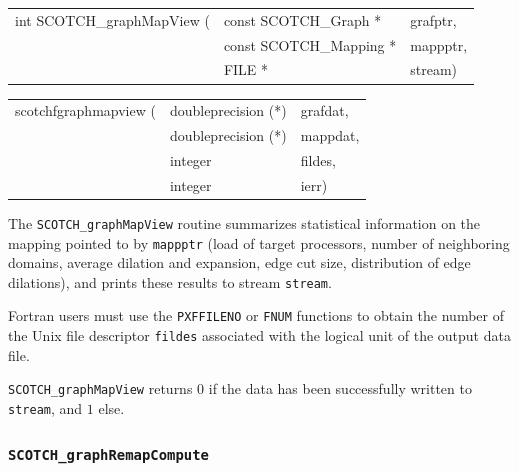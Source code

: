 \begin{itemize}
\progsyn

{\tt\begin{tabular}{l@{}ll}
int SCOTCH\_graphMapView ( & const SCOTCH\_Graph *   & grafptr, \\
                           & const SCOTCH\_Mapping * & mappptr, \\
                           & FILE *                  & stream)
\end{tabular}}

{\tt\begin{tabular}{l@{}ll}
scotchfgraphmapview ( & doubleprecision (*) & grafdat, \\
                      & doubleprecision (*) & mappdat, \\
                      & integer             & fildes,  \\
                      & integer             & ierr)
\end{tabular}}

\progdes

The {\tt SCOTCH\_graphMapView} routine summarizes statistical
information on the mapping pointed to by {\tt mappptr} (load of target
processors, number of neighboring domains, average dilation and
expansion, edge cut size, distribution of edge dilations), and prints
these results to stream {\tt stream}.

Fortran users must use the {\tt PXFFILENO} or {\tt FNUM} functions to
obtain the number of the Unix file descriptor {\tt fildes} associated
with the logical unit of the output data file.

\progret

{\tt SCOTCH\_graphMapView} returns $0$ if the data has been
successfully written to {\tt stream}, and $1$ else.
\end{itemize}

\subsubsection{{\tt SCOTCH\_graphRemapCompute}}

